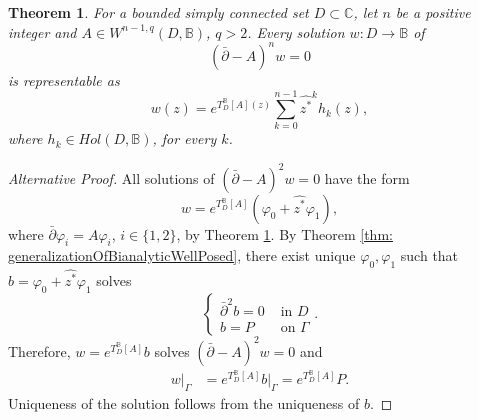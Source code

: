 \documentclass[10pt,a4paper]{amsart}
\newtheorem{theorem}{Theorem}
\newcommand{\bc}{\mathbb{B}}
\newcommand{\dbar}{\bar\partial}
\begin{document}
            \begin{theorem}\label{thm: bchoivsimprinreptheorem}
                For a bounded simply connected set $D \subset \mathbb{C}$, let $n$ be a positive integer and $A \in W^{n-1, q}(D,\bc)$, $q>2$. Every solution $w: D \to\bc$ of 
                \[
                    (\dbar- A)^n w = 0
                \]
                is representable as 
                \[
                    w(z) = e^{T_D^\bc[A](z)}\sum_{k=0}^{n-1} \widehat{z^*}^k h_k(z),
                \]
                where $h_k\in Hol(D,\bc)$, for every $k$.
            \end{theorem}

            \begin{proof}[Alternative Proof]
                All solutions of $(\dbar - A)^2 w = 0$ have the form 
                \[
                    w = e^{T_D^\bc[A]} (\varphi_0 + \widehat{z^*}\varphi_1),
                \]
                where $\dbar \varphi_i = A\varphi_i$, $i \in \{1,2\}$, by Theorem \ref{thm: bchoivsimprinreptheorem}. By Theorem \ref{thm: generalizationOfBianalyticWellPosed}, there exist unique $\varphi_0, \varphi_1$ such that $b = \varphi_0 + \widehat{z^*} \varphi_1$ solves
                \[
                    \begin{cases}
                        \dbar^2 b = 0 & \text{ in } D\\
                        b = P & \text{ on } \Gamma
                    \end{cases}.
                \]
                Therefore, $w = e^{T_D^\bc[A]} b$ solves $(\dbar - A)^2 w = 0$ and 
                \begin{align*}
                    w|_{\Gamma} &= e^{T_D^\bc[A]} b|_{\Gamma}
                    = e^{T_D^\bc[A]} P. 
                \end{align*}
                Uniqueness of the solution follows from the uniqueness of $b$. 
            \end{proof}
\end{document}
